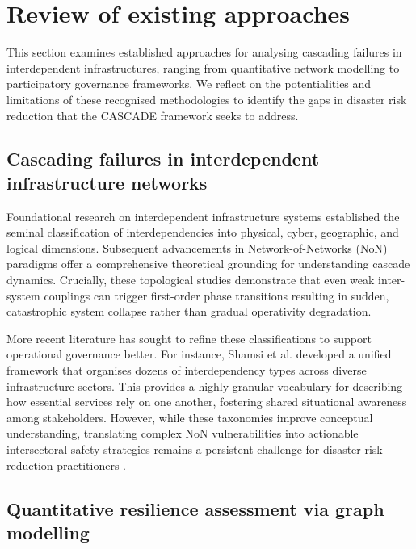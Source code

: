 \documentclass[review,12pt]{elsarticle}
\begin{document}
\section{Review of existing approaches}
\label{sec:litreview}
This section examines established approaches for analysing cascading failures in interdependent infrastructures, ranging from quantitative network modelling to participatory governance frameworks. We reflect on the potentialities and limitations of these recognised methodologies to identify the gaps in disaster risk reduction \cite{zio2016challenges, brunner_understanding_2024} that the CASCADE framework seeks to address.

\subsection{Cascading failures in interdependent infrastructure networks}
\label{subsec:cascades}
Foundational research on interdependent infrastructure systems \cite{Rinaldi2002_Interdependencies, Rinaldi2004ModelingAS} established the seminal classification of interdependencies into physical, cyber, geographic, and logical dimensions. Subsequent advancements in Network-of-Networks (NoN) paradigms \cite{buldyrev_catastrophic_2010, Gao2012_NaturePhysics, aleta_multilayer_2026} offer a comprehensive theoretical grounding for understanding cascade dynamics. Crucially, these topological studies demonstrate that even weak inter-system couplings can trigger first-order phase transitions resulting in sudden, catastrophic system collapse rather than gradual operativity degradation. 

More recent literature has sought to refine these classifications to support operational governance better. For instance, Shamsi et al. \cite{shamsi2025interdependency} developed a unified framework that organises dozens of interdependency types across diverse infrastructure sectors. This provides a highly granular vocabulary for describing how essential services rely on one another, fostering shared situational awareness among stakeholders. However, while these taxonomies improve conceptual understanding, translating complex NoN vulnerabilities into actionable intersectoral safety strategies remains a persistent challenge for disaster risk reduction practitioners \cite{Pescaroli2018}.

\subsection{Quantitative resilience assessment via graph modelling}
\label{subsec:graph}
\end{document}

